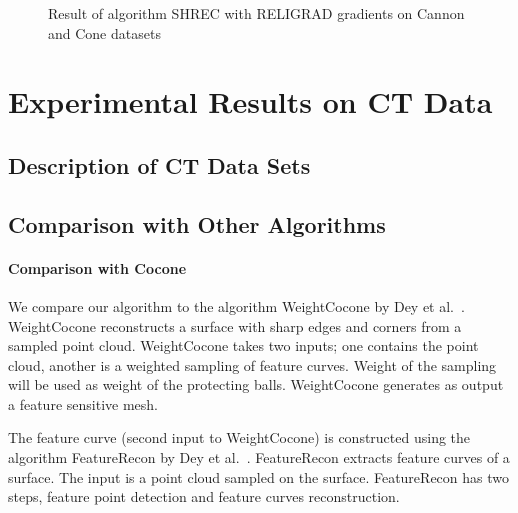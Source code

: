\begin{figure}[tb]
	\caption{Result of algorithm SHREC with RELIGRAD gradients on Cannon and Cone datasets}
	\label{fig:cannon_cone}
\end{figure}
\section{Experimental Results on CT Data}

\subsection{Description of CT Data Sets}

\subsection{Comparison with Other Algorithms}
\paragraph{Comparison with Cocone}
We compare our algorithm to the algorithm WeightCocone by Dey et al.~\cite{Dey2012}. WeightCocone reconstructs a surface with sharp edges and corners from a sampled point cloud. WeightCocone takes two inputs; one contains the point cloud, another is a weighted sampling of feature curves. Weight of the sampling will be used as weight of the protecting balls. WeightCocone generates as output a feature sensitive mesh. 

The feature curve (second input to WeightCocone) is constructed using the algorithm FeatureRecon by Dey et al.~\cite{Dey2013}. FeatureRecon extracts feature curves of a surface. The input is a point cloud sampled on the surface. FeatureRecon has two steps, feature point detection and feature curves reconstruction. 

